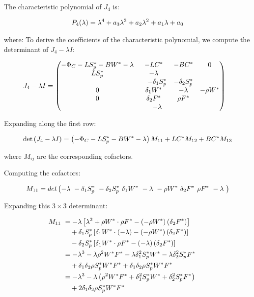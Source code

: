 \documentclass[10pt]{NSP1}
\newcommand{\fitwidth}[1]{\resizebox{\ifdim\width>\linewidth\linewidth\else\width\fi}{!}{#1}}
\begin{document}
The characteristic polynomial of \(J_{4}\) is:

\[
\fitwidth{$\displaystyle P_{4}(\lambda) = \lambda^{4} + a_{3}\lambda^{3} + a_{2}\lambda^{2} + a_{1}\lambda + a_{0}$}
\]

where: To derive the coefficients of the characteristic polynomial, we compute the determinant of \(J_{4} - \lambda I\):

\[
\fitwidth{$\displaystyle \begin{aligned}
&J_{4} - \lambda I = \begin{pmatrix}
-\Phi_{C} - LS_{p}^{*} - BW^{*} - \lambda & -LC^{*} & -BC^{*} & 0 \\
LS_{p}^{*} & -\lambda & \\
&\quad -\delta_{1}S_{p}^{*} & -\delta_{2}S_{p}^{*} \\
0 & \delta_{1}W^{*} & -\lambda & -\rho W^{*} \\
0 & \delta_{2}F^{*} & \rho F^{*} & \\
&\quad -\lambda
\end{pmatrix}
\end{aligned}$}
\]

Expanding along the first row:

\[
\fitwidth{$\displaystyle \det\left( J_{4} - \lambda I \right) = \left( - \Phi_{C} - LS_{p}^{*} - BW^{*} - \lambda \right)M_{11} + LC^{*}M_{12} + BC^{*}M_{13}$}
\]

where \(M_{ij}\) are the corresponding cofactors.

Computing the cofactors:

\[
\fitwidth{$\displaystyle M_{11} = det\left( - \lambda\  - \delta_{1}S_{p}^{*}\  - \delta_{2}S_{p}^{*}\ \delta_{1}W^{*}\  - \lambda\  - \rho W^{*}\ \delta_{2}F^{*}\ \rho F^{*}\  - \lambda\  \right)$}
\]

Expanding this \(3 \times 3\) determinant:

\[
\fitwidth{$\displaystyle \begin{aligned}
M_{11}\ &= - \lambda\left\lbrack \lambda^{2} + \rho W^{*} \cdot \rho F^{*} - \left( - \rho W^{*} \right)\left( \delta_{2}F^{*} \right) \right\rbrack\ \ \quad \\
&\quad + \delta_{1}S_{p}^{*}\left\lbrack \delta_{1}W^{*} \cdot ( - \lambda) - \left( - \rho W^{*} \right)\left( \delta_{2}F^{*} \right) \right\rbrack\ \ \quad \\
&\quad - \delta_{2}S_{p}^{*}\left\lbrack \delta_{1}W^{*} \cdot \rho F^{*} - ( - \lambda)\left( \delta_{2}F^{*} \right) \right\rbrack \\
\ &= - \lambda^{3} - \lambda\rho^{2}W^{*}F^{*} - \lambda\delta_{1}^{2}S_{p}^{*}W^{*} - \lambda\delta_{2}^{2}S_{p}^{*}F^{*}\ \ \quad \\
&\quad + \delta_{1}\delta_{2}\rho S_{p}^{*}W^{*}F^{*} + \delta_{1}\delta_{2}\rho S_{p}^{*}W^{*}F^{*} \\
\ &= - \lambda^{3} - \lambda\left( \rho^{2}W^{*}F^{*} + \delta_{1}^{2}S_{p}^{*}W^{*} + \delta_{2}^{2}S_{p}^{*}F^{*} \right) \\
&\quad + 2\delta_{1}\delta_{2}\rho S_{p}^{*}W^{*}F^{*}\
\end{aligned}$}
\]
\end{document}
